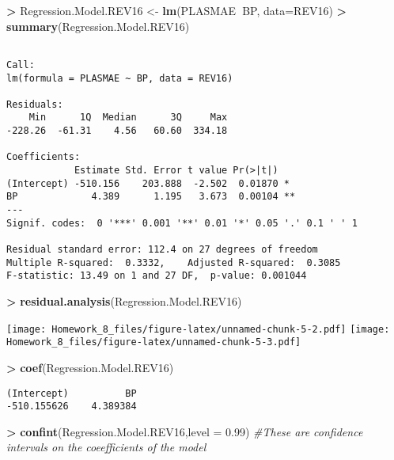 \documentclass[]{article}
\newenvironment{Shaded}{\begin{snugshade}}{\end{snugshade}}
\newcommand{\KeywordTok}[1]{\textcolor[rgb]{0.13,0.29,0.53}{\textbf{#1}}}
\newcommand{\DataTypeTok}[1]{\textcolor[rgb]{0.13,0.29,0.53}{#1}}
\newcommand{\FloatTok}[1]{\textcolor[rgb]{0.00,0.00,0.81}{#1}}
\newcommand{\StringTok}[1]{\textcolor[rgb]{0.31,0.60,0.02}{#1}}
\newcommand{\CommentTok}[1]{\textcolor[rgb]{0.56,0.35,0.01}{\textit{#1}}}
\newcommand{\OperatorTok}[1]{\textcolor[rgb]{0.81,0.36,0.00}{\textbf{#1}}}
\newcommand{\NormalTok}[1]{#1}
\begin{document}
\begin{Shaded}
\begin{Highlighting}[]
\OperatorTok{>}\StringTok{ }\NormalTok{Regression.Model.REV16 <-}\StringTok{ }\KeywordTok{lm}\NormalTok{(PLASMAE}\OperatorTok{~}\NormalTok{BP, }\DataTypeTok{data=}\NormalTok{REV16)}
\OperatorTok{>}\StringTok{ }\KeywordTok{summary}\NormalTok{(Regression.Model.REV16)}
\end{Highlighting}
\end{Shaded}

\begin{verbatim}

Call:
lm(formula = PLASMAE ~ BP, data = REV16)

Residuals:
    Min      1Q  Median      3Q     Max 
-228.26  -61.31    4.56   60.60  334.18 

Coefficients:
            Estimate Std. Error t value Pr(>|t|)   
(Intercept) -510.156    203.888  -2.502  0.01870 * 
BP             4.389      1.195   3.673  0.00104 **
---
Signif. codes:  0 '***' 0.001 '**' 0.01 '*' 0.05 '.' 0.1 ' ' 1

Residual standard error: 112.4 on 27 degrees of freedom
Multiple R-squared:  0.3332,    Adjusted R-squared:  0.3085 
F-statistic: 13.49 on 1 and 27 DF,  p-value: 0.001044
\end{verbatim}

\begin{Shaded}
\begin{Highlighting}[]
\OperatorTok{>}\StringTok{ }\KeywordTok{residual.analysis}\NormalTok{(Regression.Model.REV16)}
\end{Highlighting}
\end{Shaded}

\texttt{[image: Homework\_8\_files/figure-latex/unnamed-chunk-5-2.pdf]}
\texttt{[image: Homework\_8\_files/figure-latex/unnamed-chunk-5-3.pdf]}

\begin{Shaded}
\begin{Highlighting}[]
\OperatorTok{>}\StringTok{ }\KeywordTok{coef}\NormalTok{(Regression.Model.REV16)}
\end{Highlighting}
\end{Shaded}

\begin{verbatim}
(Intercept)          BP 
-510.155626    4.389384 
\end{verbatim}

\begin{Shaded}
\begin{Highlighting}[]
\OperatorTok{>}\StringTok{ }\KeywordTok{confint}\NormalTok{(Regression.Model.REV16,}\DataTypeTok{level =} \FloatTok{0.99}\NormalTok{) }\CommentTok{#These are confidence intervals on the coeefficients of the model}
\end{Highlighting}
\end{Shaded}
\end{document}

